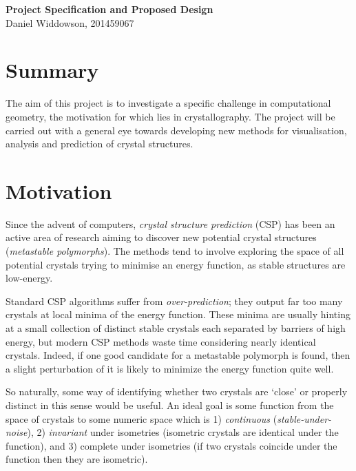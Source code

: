\documentclass[12pt]{article}
\begin{document}
\null

   \begin{center}
      \Large\textbf{Project Specification and Proposed Design}\\
      \large{Daniel Widdowson, 201459067}
   \end{center}

\null

\null

\section{Summary}

The aim of this project is to investigate a specific challenge in computational geometry, the motivation for which lies in crystallography. The project will be carried out with a general eye towards developing new methods for visualisation, analysis and prediction of crystal structures. 

\section{Motivation}

Since the advent of computers, \emph{crystal structure prediction} (CSP) has been an active area of research aiming to discover new potential crystal structures (\emph{metastable polymorphs}). The methods tend to involve exploring the space of all potential crystals trying to minimise an energy function, as stable structures are low-energy. 

Standard CSP algorithms suffer from \emph{over-prediction}; they output far too many crystals at local minima of the energy function. These minima are usually hinting at a small collection of distinct stable crystals each separated by barriers of high energy, but modern CSP methods waste time considering nearly identical crystals. Indeed, if one good candidate for a metastable polymorph is found, then a slight perturbation of it is likely to minimize the energy function quite well. 

So naturally, some way of identifying whether two crystals are `close' or properly distinct in this sense would be useful. An ideal goal is some function from the space of crystals to some numeric space which is 1) \emph{continuous} (\emph{stable-under-noise}), 2) \emph{invariant} under isometries (isometric crystals are identical under the function), and 3) complete under isometries (if two crystals coincide under the function then they are isometric). 
\end{document}
